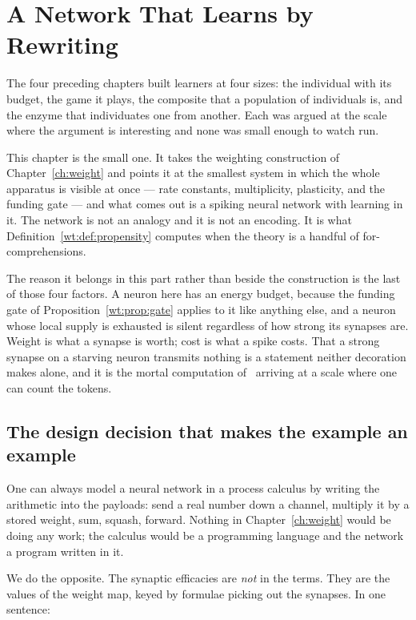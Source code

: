 \chapter{A Network That Learns by Rewriting}
\label{ch:spiking}

The four preceding chapters built learners at four sizes: the individual with its
budget, the game it plays, the composite that a population of individuals is, and the
enzyme that individuates one from another. Each was argued at the scale where the
argument is interesting and none was small enough to watch run.

This chapter is the small one. It takes the weighting construction of
Chapter~\ref{ch:weight} and points it at the smallest system in which the whole
apparatus is visible at once --- rate constants, multiplicity, plasticity, and the
funding gate --- and what comes out is a spiking neural network with learning in it. The
network is not an analogy and it is not an encoding. It is what
Definition~\ref{wt:def:propensity} computes when the theory is a handful of
for-comprehensions.

The reason it belongs in this part rather than beside the construction is the last of
those four factors. A neuron here has an energy budget, because the funding gate of
Proposition~\ref{wt:prop:gate} applies to it like anything else, and a neuron whose local
supply is exhausted is silent regardless of how strong its synapses are. Weight is what a
synapse is worth; cost is what a spike costs. That a strong synapse on a starving neuron
transmits nothing is a statement neither decoration makes alone, and it is the mortal
computation of \chSci\ arriving at a scale where one can count the tokens.

\section{The design decision that makes the example an example}

One can always model a neural network in a process calculus by writing the arithmetic
into the payloads: send a real number down a channel, multiply it by a stored weight,
sum, squash, forward. Nothing in Chapter~\ref{ch:weight} would be doing any work; the
calculus would be a programming language and the network a program written in it.

We do the opposite. The synaptic efficacies are \emph{not} in the terms. They are the
values of the weight map, keyed by formulae picking out the synapses. In one sentence:

